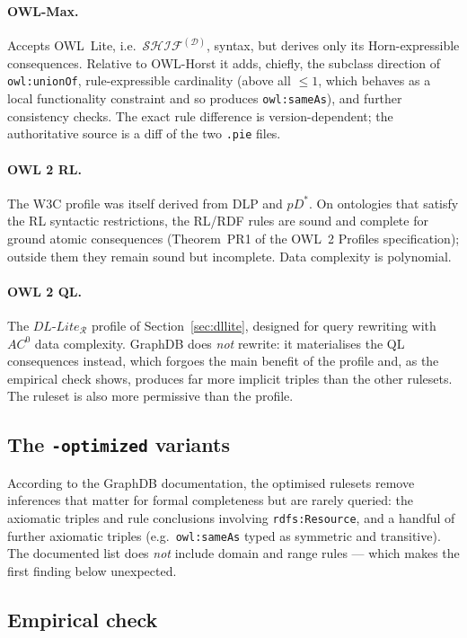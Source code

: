 \documentclass[11pt,a4paper]{article}
\newcommand{\dl}[1]{\ensuremath{\mathcal{#1}}}
\newcommand{\SHIF}{\dl{SHIF}}
\newcommand{\dllite}[1]{\ensuremath{\textit{DL-Lite}_{#1}}}
\begin{document}
\paragraph{OWL-Max.} Accepts OWL~Lite, i.e.\ $\SHIF^{(\mathcal{D})}$, syntax, but
derives only its Horn-expressible consequences. Relative to OWL-Horst it adds,
chiefly, the subclass direction of \texttt{owl:unionOf}, rule-expressible
cardinality (above all ${\leq}1$, which behaves as a local functionality
constraint and so produces \texttt{owl:sameAs}), and further consistency
checks. The exact rule difference is version-dependent; the authoritative
source is a diff of the two \texttt{.pie} files.

\paragraph{OWL 2 RL.} The W3C profile was itself derived from DLP and $pD^*$.
On ontologies that satisfy the RL syntactic restrictions, the RL/RDF rules are
sound and complete for ground atomic consequences (Theorem~PR1 of the OWL~2
Profiles specification); outside them they remain sound but incomplete. Data
complexity is polynomial.

\paragraph{OWL 2 QL.} The $\dllite{\mathcal{R}}$ profile of
Section~\ref{sec:dllite}, designed for query rewriting with $AC^0$ data
complexity. GraphDB does \emph{not} rewrite: it materialises the QL
consequences instead, which forgoes the main benefit of the profile and, as the
empirical check shows, produces far more implicit triples than the other
rulesets. The ruleset is also more permissive than the profile.

\subsection*{The \texttt{-optimized} variants}

According to the GraphDB documentation, the optimised rulesets remove
inferences that matter for formal completeness but are rarely queried: the
axiomatic triples and rule conclusions involving \texttt{rdfs:Resource}, and
a handful of further axiomatic triples (e.g.\ \texttt{owl:sameAs} typed as
symmetric and transitive). The documented list does \emph{not} include domain
and range rules --- which makes the first finding below unexpected.

\subsection*{Empirical check}
\end{document}
